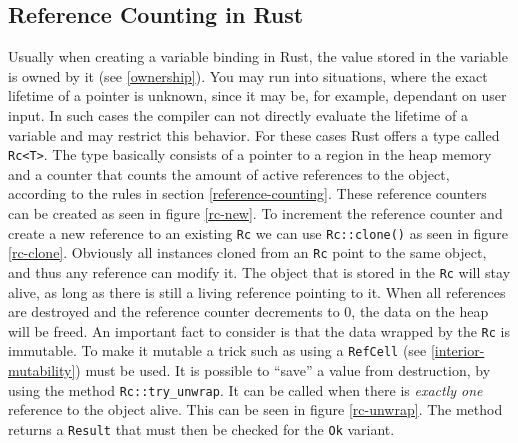 \documentclass[twocolumn]{article}
\begin{document}
\subsection{Reference Counting in Rust}
Usually when creating a variable binding in Rust, the value stored in the variable is owned by it (see \ref{ownership}).
You may run into situations, where the exact lifetime of a pointer is unknown, since it may be, for example, dependant on user input.
In such cases the compiler can not directly evaluate the lifetime of a variable and may restrict this behavior.
For these cases Rust offers a type called \texttt{Rc<T>}\cite{RustDoc-Rc}.
The type basically consists of a pointer to a region in the heap memory and a counter that counts the amount of active references to the object, according to the rules in section \ref{reference-counting}.
These reference counters can be created as seen in figure \ref{rc-new}.
To increment the reference counter and create a new reference to an existing \texttt{Rc} we can use \texttt{Rc::clone()} as seen in figure \ref{rc-clone}.
Obviously all instances cloned from an \texttt{Rc} point to the same object, and thus any reference can modify it.
The object that is stored in the \texttt{Rc} will stay alive, as long as there is still a living reference pointing to it.
When all references are destroyed and the reference counter decrements to 0, the data on the heap will be freed.
An important fact to consider is that the data wrapped by the \texttt{Rc} is immutable.
To make it mutable a trick such as using a \texttt{RefCell} (see \ref{interior-mutability}) must be used.
It is possible to ``save'' a value from destruction, by using the method \texttt{Rc::try_unwrap}.
It can be called when there is \textit{exactly one} reference to the object alive.
This can be seen in figure \ref{rc-unwrap}.
The method returns a \texttt{Result} that must then be checked for the \texttt{Ok}
variant.
\end{document}
